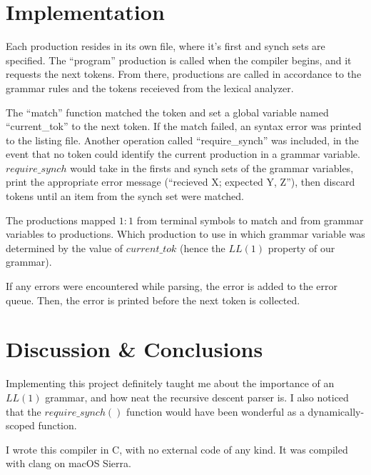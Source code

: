 \documentclass[titlepage]{article}
\begin{document}
    
    
    
    
    

    \section{Implementation}
    Each production resides in its own file, where it's first and synch sets
    are specified. The ``program'' production is called when the compiler
    begins, and it requests the next tokens. From there, productions are called
    in accordance to the grammar rules and the tokens receieved from the lexical
    analyzer.

    The ``match'' function matched the token and set a global variable named
    ``current\_tok'' to the next token. If the match failed, an syntax error
    was printed to the listing file. Another operation called
    ``require\_synch'' was included, in the event that no token could
    identify the current production in a grammar variable. $require\_synch$
    would take in the firsts and synch sets of the grammar variables, print the
    appropriate error message (``recieved X; expected Y, Z''), then discard %
    tokens until an item from the synch set were matched.

    The productions mapped $1:1$ from terminal symbols to match and
    from grammar variables to productions. Which production to use
    in which grammar variable was determined by the value of $current\_tok$
    (hence the $LL(1)$ property of our grammar).

    If any errors were encountered while parsing, the error is added
    to the error queue. Then, the error is printed before the next token
    is collected.

    \section{Discussion \& Conclusions}
    Implementing this project definitely taught me about the importance
    of an $LL(1)$ grammar, and how neat the recursive descent parser is.
    I also noticed that the $require\_synch()$ function would have been
    wonderful as a dynamically-scoped function.

    I wrote this compiler in C, with no external code of any kind. It was
    compiled with clang on macOS Sierra.
\end{document}
